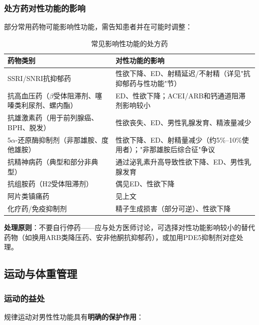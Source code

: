 \documentclass[12pt,a4paper,twoside]{ctexbook}
\begin{document}
\subsubsection{处方药对性功能的影响}

部分常用药物可能影响性功能，需告知患者并在可能时调整：

\begin{table}[htbp]
\centering
\caption{常见影响性功能的处方药}
\label{tab:drug_sexual_effects}
\begin{tabularx}{\textwidth}{@{}lX@{}}
    \toprule
    \textbf{药物类别} & \textbf{对性功能的影响} \\
    \midrule
    SSRI/SNRI抗抑郁药 & 性欲下降、ED、射精延迟/不射精（详见"抗抑郁药与性功能"节） \\
    抗高血压药（$\beta$受体阻滞剂、噻嗪类利尿剂、螺内酯） & ED、性欲下降；ACEI/ARB和钙通道阻滞剂影响较小 \\
    抗雄激素药（用于前列腺癌、BPH、脱发） & 性欲丧失、ED、男性乳腺发育、精液量减少 \\
    5$\alpha$-还原酶抑制剂（非那雄胺、度他雄胺） & 性欲下降、ED、射精量减少（约5\%--10\%使用者）；"非那雄胺后综合征"争议 \\
    抗精神病药（典型和部分非典型） & 通过泌乳素升高导致性欲下降、ED、男性乳腺发育 \\
    抗组胺药（H2受体阻滞剂） & 偶见ED、性欲下降 \\
    阿片类镇痛药 & 见上文 \\
    化疗药/免疫抑制剂 & 精子生成损害（部分可逆）、性欲下降 \\
    \bottomrule
\end{tabularx}
\end{table}

\textbf{处理原则}：不要自行停药——应与处方医师讨论，可选择对性功能影响较小的替代药物（如换用ARB类降压药、安非他酮抗抑郁药），或加用PDE5抑制剂对症处理。

\subsection{运动与体重管理}

\subsubsection{运动的益处}

规律运动对男性性功能具有\textbf{明确的保护作用}：
\end{document}
